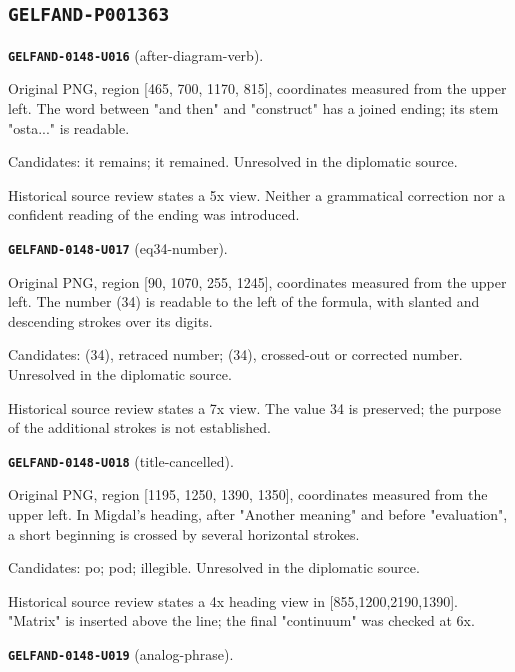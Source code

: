 \documentclass[11pt]{article}
\theoremstyle{definition}
\theoremstyle{remark}
\begin{document}
\subsection*{\texttt{GELFAND-P001363}}
\noindent\leavevmode{}\label{GELFAND-P001363:after-diagram-verb:note}\textbf{\texttt{GELFAND-0148-U016}} (after-diagram-verb).\par\nopagebreak[4]
Original PNG, region [465, 700, 1170, 815], coordinates measured from the upper left. The word between "and then" and "construct" has a joined ending; its stem "osta..." is readable.\par
Candidates: it remains; it remained. Unresolved in the diplomatic source.\par
Historical source review states a 5x view. Neither a grammatical correction nor a confident reading of the ending was introduced.\par\medskip
\noindent\leavevmode{}\label{GELFAND-P001363:eq34-number:note}\textbf{\texttt{GELFAND-0148-U017}} (eq34-number).\par\nopagebreak[4]
Original PNG, region [90, 1070, 255, 1245], coordinates measured from the upper left. The number (34) is readable to the left of the formula, with slanted and descending strokes over its digits.\par
Candidates: (34), retraced number; (34), crossed-out or corrected number. Unresolved in the diplomatic source.\par
Historical source review states a 7x view. The value 34 is preserved; the purpose of the additional strokes is not established.\par\medskip
\noindent\leavevmode{}\label{GELFAND-P001363:title-cancelled:note}\textbf{\texttt{GELFAND-0148-U018}} (title-cancelled).\par\nopagebreak[4]
Original PNG, region [1195, 1250, 1390, 1350], coordinates measured from the upper left. In Migdal's heading, after "Another meaning" and before "evaluation", a short beginning is crossed by several horizontal strokes.\par
Candidates: po; pod; illegible. Unresolved in the diplomatic source.\par
Historical source review states a 4x heading view in [855,1200,2190,1390]. "Matrix" is inserted above the line; the final "continuum" was checked at 6x.\par\medskip
\noindent\leavevmode{}\label{GELFAND-P001363:analog-phrase:note}\textbf{\texttt{GELFAND-0148-U019}} (analog-phrase).\par\nopagebreak[4]
\end{document}

